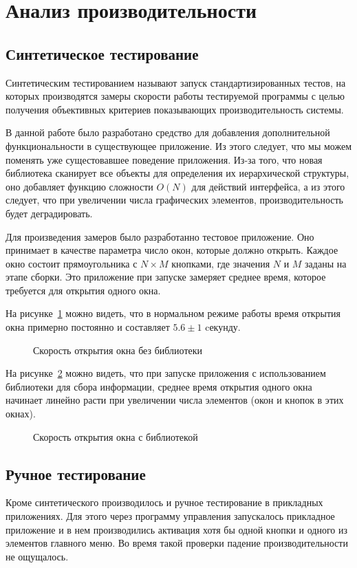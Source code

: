 \section{Анализ производительности}

\subsection{Синтетическое тестирование}

Синтетическим тестированием называют запуск стандартизированных тестов,
на которых производятся замеры скорости работы тестируемой программы с целью
получения объективных критериев показывающих производительность системы.

В данной работе было разработано средство для добавления дополнительной
функциональности в существующее приложение. Из этого следует, что мы можем
поменять уже сущестовавшее поведение приложения. Из-за того, что новая
библиотека сканирует все объекты для определения их иерархической структуры, оно
добавляет функцию сложности $O(N)$ для действий интерфейса, а из этого следует,
что при увеличении числа графических элементов, производительность будет
деградировать.

Для произведения замеров было разработанно тестовое приложение. Оно принимает в
качестве параметра число окон, которые должно открыть. Каждое окно состоит
прямоугольника с $N \times M$ кнопками, где значения $N$ и $M$ заданы на этапе
сборки. Это приложение при запуске замеряет среднее время, которое требуется
для открытия одного окна.

На рисунке~\ref{normal-perf} можно видеть, что в нормальном режиме работы
время открытия окна примерно постоянно и составляет $5.6\pm1$ cекунду.

\begin{figure}[h]
	\centering
	
	\caption{Скорость открытия окна без библиотеки}\label{normal-perf}
\end{figure}

На рисунке~\ref{lib-perf} можно видеть, что при запуске приложения с использованием
библиотеки для сбора информации, среднее время открытия одного окна начинает
линейно расти при увеличении числа элементов (окон и кнопок в этих окнах).

\begin{figure}[h]
	\centering
	
	\caption{Скорость открытия окна с библиотекой}\label{lib-perf}
\end{figure}

\subsection{Ручное тестирование}

Кроме синтетического производилось и ручное тестирование в прикладных
приложениях. Для этого через программу управления запускалось прикладное
приложение и в нем производились активация хотя бы одной кнопки и одного из
элементов главного меню. Во время такой проверки падение производительности не
ощущалось.
